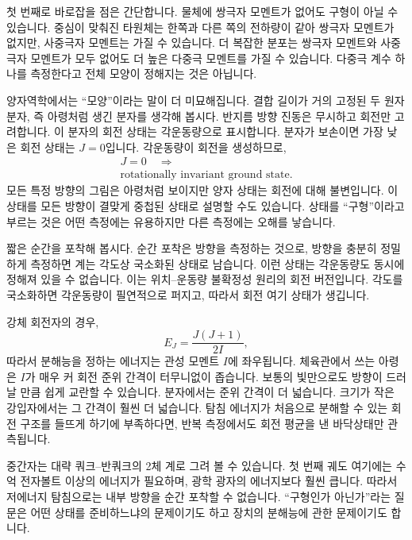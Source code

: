 첫 번째로 바로잡을 점은 간단합니다. 물체에 쌍극자 모멘트가 없어도 구형이 아닐 수 있습니다. 중심이 맞춰진 타원체는 한쪽과 다른 쪽의 전하량이 같아 쌍극자 모멘트가 없지만, 사중극자 모멘트는 가질 수 있습니다. 더 복잡한 분포는 쌍극자 모멘트와 사중극자 모멘트가 모두 없어도 더 높은 다중극 모멘트를 가질 수 있습니다. 다중극 계수 하나를 측정한다고 전체 모양이 정해지는 것은 아닙니다.

양자역학에서는 ``모양''이라는 말이 더 미묘해집니다. 결합 길이가 거의 고정된 두 원자 분자, 즉 아령처럼 생긴 분자를 생각해 봅시다. 반지름 방향 진동은 무시하고 회전만 고려합니다. 이 분자의 회전 상태는 각운동량으로 표시합니다. 분자가 보손이면 가장 낮은 회전 상태는 \(J=0\)입니다. 각운동량이 회전을 생성하므로,
\begin{equation}
\begin{gathered}
J=0 \quad\Longrightarrow\\
\text{rotationally invariant ground state.}
\end{gathered}
\end{equation}
모든 특정 방향의 그림은 아령처럼 보이지만 양자 상태는 회전에 대해 불변입니다. 이 상태를 모든 방향이 결맞게 중첩된 상태로 설명할 수도 있습니다. 상태를 ``구형''이라고 부르는 것은 어떤 측정에는 유용하지만 다른 측정에는 오해를 낳습니다.

짧은 순간을 포착해 봅시다. 순간 포착은 방향을 측정하는 것으로, 방향을 충분히 정밀하게 측정하면 계는 각도상 국소화된 상태로 남습니다. 이런 상태는 각운동량도 동시에 정해져 있을 수 없습니다. 이는 위치--운동량 불확정성 원리의 회전 버전입니다. 각도를 국소화하면 각운동량이 필연적으로 퍼지고, 따라서 회전 여기 상태가 생깁니다.

강체 회전자의 경우,
\begin{equation}
E_J=\frac{J(J+1)}{2I},
\end{equation}
따라서 분해능을 정하는 에너지는 관성 모멘트 \(I\)에 좌우됩니다. 체육관에서 쓰는 아령은 \(I\)가 매우 커 회전 준위 간격이 터무니없이 좁습니다. 보통의 빛만으로도 방향이 드러날 만큼 쉽게 교란할 수 있습니다. 분자에서는 준위 간격이 더 넓습니다. 크기가 작은 강입자에서는 그 간격이 훨씬 더 넓습니다. 탐침 에너지가 처음으로 분해할 수 있는 회전 구조를 들뜨게 하기에 부족하다면, 반복 측정에서도 회전 평균을 낸 바닥상태만 관측됩니다.

중간자는 대략 쿼크--반쿼크의 2체 계로 그려 볼 수 있습니다. 첫 번째 궤도 여기에는 수억 전자볼트 이상의 에너지가 필요하며, 광학 광자의 에너지보다 훨씬 큽니다. 따라서 저에너지 탐침으로는 내부 방향을 순간 포착할 수 없습니다. ``구형인가 아닌가''라는 질문은 어떤 상태를 준비하느냐의 문제이기도 하고 장치의 분해능에 관한 문제이기도 합니다.

